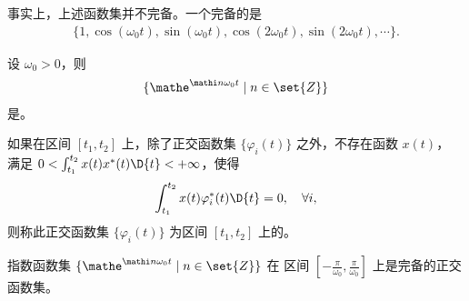 \begin{note}
    事实上，上述函数集并不完备。一个完备的是
    \begin{align*}
        \{1, \cos(\omega_0t), \sin(\omega_0t), \cos(2\omega_0t), \sin(2\omega_0t), \cdots\}.
    \end{align*}
\end{note}

\begin{definition}[指数函数集]
    设 $\omega_0 > 0$，则
    \begin{align*}
        \{\mathe^{\mathi n\omega_0t} \mid n \in \set{Z}\}
    \end{align*}
    是。
\end{definition}

\begin{definition}[完备的正交函数集]
    如果在区间 $[t_1, t_2]$ 上，除了正交函数集 $\{\varphi_i(t)\}$ 之外，不存在函数 $x(t)$，
    满足 $0 < \int_{t_1}^{t_2}x(t)x^*(t)\D{t} < +\infty$，使得
    \begin{align*}
        \int_{t_1}^{t_2}x(t)\varphi_i^*(t)\D{t} = 0, \quad \forall i,
    \end{align*}
    则称此正交函数集 $\{\varphi_i(t)\}$ 为区间 $[t_1, t_2]$ 上的。
\end{definition}

\begin{property}
    指数函数集 $\{\mathe^{\mathi n\omega_0t} \mid n \in \set{Z}\}$ 在
    区间 $[-\frac{\pi}{\omega_0}, \frac{\pi}{\omega_0}]$ 上是完备的正交函数集。
\end{property}


